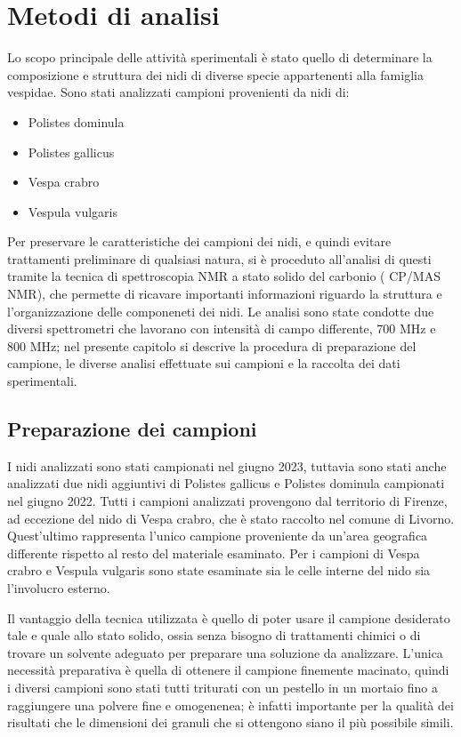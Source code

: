 
\chapter{Metodi di analisi}
\label{cap:proposal}

Lo scopo principale delle attività sperimentali è stato quello di determinare la composizione e struttura dei nidi di diverse specie appartenenti alla famiglia vespidae.
Sono stati analizzati campioni provenienti da nidi di:

\begin{itemize}
    \item Polistes dominula
    \item Polistes gallicus
    \item Vespa crabro
    \item Vespula vulgaris
\end{itemize}

Per preservare le caratteristiche dei campioni dei nidi, e quindi evitare trattamenti preliminare di qualsiasi natura, si è proceduto all'analisi di questi tramite la tecnica di spettroscopia NMR a stato solido del carbonio ( CP/MAS NMR), che permette di ricavare importanti informazioni riguardo la struttura e l'organizzazione delle componeneti dei nidi.
Le analisi sono state condotte due diversi spettrometri che lavorano con intensità di campo differente, 700 MHz e 800 MHz; nel presente capitolo si descrive la procedura di preparazione del campione, le diverse analisi effettuate sui campioni e la raccolta dei dati sperimentali.

\section{Preparazione dei campioni}

I nidi analizzati sono stati campionati nel giugno 2023, tuttavia sono stati anche analizzati due nidi aggiuntivi di Polistes gallicus e Polistes dominula campionati nel giugno 2022.
Tutti i campioni analizzati provengono dal territorio di Firenze, ad eccezione del nido di Vespa crabro, che è stato raccolto nel comune di Livorno. 
Quest’ultimo rappresenta l’unico campione proveniente da un’area geografica differente rispetto al resto del materiale esaminato.
Per i campioni di Vespa crabro e Vespula vulgaris sono state esaminate sia le celle interne del nido sia l'involucro esterno.

Il vantaggio della tecnica utilizzata è quello di poter usare il campione desiderato tale e quale allo stato solido, ossia senza bisogno di trattamenti chimici o di trovare un solvente adeguato per preparare una soluzione da analizzare.
L'unica necessità preparativa è quella di ottenere il campione finemente macinato, quindi i diversi campioni sono stati tutti triturati con un pestello in un mortaio fino a raggiungere una polvere fine e omogenenea; è infatti importante per la qualità dei risultati che le dimensioni dei granuli che si ottengono siano il più possibile simili.

